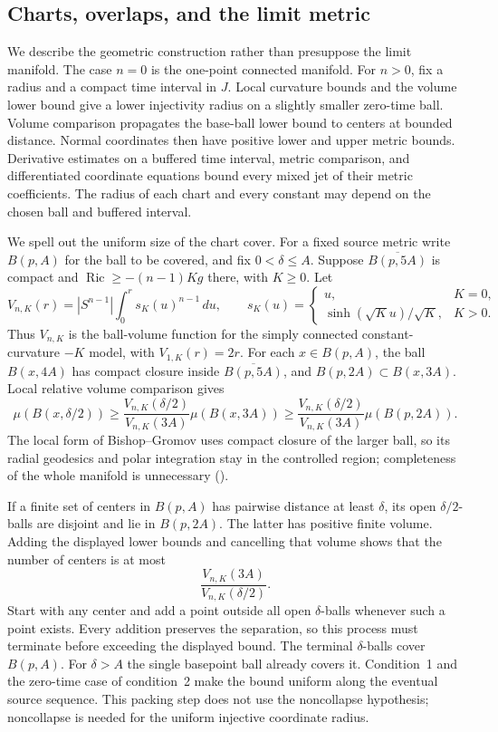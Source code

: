 \subsection{Charts, overlaps, and the limit metric}

We describe the geometric construction rather than presuppose the
limit manifold.  The case $n=0$ is the one-point connected manifold.
For $n>0$, fix a radius and a compact time interval in $J$.
Local curvature bounds and the volume lower bound give a lower
injectivity radius on a slightly smaller zero-time ball.
Volume comparison propagates the base-ball lower bound to centers
at bounded distance.  Normal coordinates then have positive lower
and upper metric bounds.  Derivative estimates on a buffered time
interval, metric comparison, and differentiated coordinate equations
bound every mixed jet of their metric coefficients.  The radius of
each chart and every constant may depend on the chosen ball and
buffered interval.

We spell out the uniform size of the chart cover.  For a fixed source
metric write $B(p,A)$ for the ball to be covered, and fix
$0<\delta\leq A$.  Suppose $\overline{B(p,5A)}$ is compact and
$\operatorname{Ric}\geq-(n-1)Kg$ there, with $K\geq0$.  Let
\[
 V_{n,K}(r)=|S^{n-1}|\int_0^r s_K(u)^{n-1}\,du,\qquad
 s_K(u)=
 \begin{cases}
 u,&K=0,\\
 \sinh(\sqrt K u)/\sqrt K,&K>0.
 \end{cases}
\]
Thus $V_{n,K}$ is the ball-volume function for the simply connected
constant-curvature $-K$ model, with $V_{1,K}(r)=2r$.
For each $x\in B(p,A)$, the ball $B(x,4A)$ has compact closure
inside $\overline{B(p,5A)}$, and $B(p,2A)\subset B(x,3A)$.
Local relative volume comparison gives
\[
 \mu(B(x,\delta/2))
 \geq\frac{V_{n,K}(\delta/2)}{V_{n,K}(3A)}
                          \mu(B(x,3A))
 \geq\frac{V_{n,K}(\delta/2)}{V_{n,K}(3A)}
                          \mu(B(p,2A)).
\]
The local form of Bishop--Gromov uses compact closure of the larger
ball, so its radial geodesics and polar integration stay in the
controlled region; completeness of the whole manifold is unnecessary
(\cite[Theorem 1.34, p.~19; proof of Theorem 5.6, p.~86]{MT2007}).

If a finite set of centers in $B(p,A)$ has pairwise distance at least
$\delta$, its open $\delta/2$-balls are disjoint and lie in $B(p,2A)$.
The latter has positive finite volume.  Adding the displayed lower
bounds and cancelling that volume shows that the number of centers
is at most
\[
                         \frac{V_{n,K}(3A)}{V_{n,K}(\delta/2)}.
\]
Start with any center and add a point outside all open $\delta$-balls
whenever such a point exists.  Every addition preserves the separation,
so this process must terminate before exceeding the displayed bound.
The terminal $\delta$-balls cover $B(p,A)$.  For $\delta>A$ the
single basepoint ball already covers it.
Condition~1 and the zero-time case of condition~2 make the bound
uniform along the eventual source sequence.  This packing step does
not use the noncollapse hypothesis; noncollapse is needed for the
uniform injective coordinate radius.

